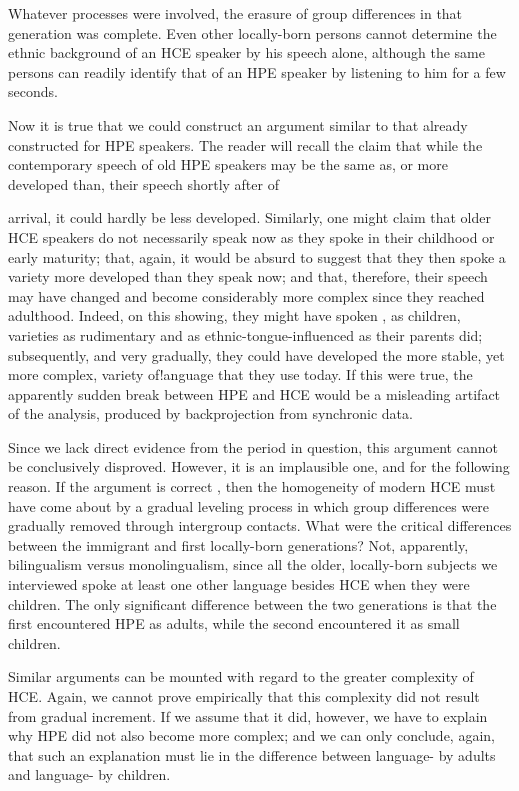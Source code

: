 Whatever processes were involved, the erasure of group differ\-ences in that generation was complete. Even other locally-born persons cannot determine the ethnic background of an HCE speaker by his speech alone, although the same persons can readily identify that of an HPE speaker by listening to him for a few seconds.

Now it is true that we could construct an argument similar to that already constructed for HPE speakers. The reader will recall the claim that while the contemporary speech of old HPE speakers may be the same as, or more developed than, their speech shortly after  of


arrival, it could hardly be less developed. Similarly, one might claim that older HCE speakers do not necessarily speak now as they spoke in their childhood or early maturity; that, again, it would be absurd to suggest that they then spoke a variety more developed than they speak now; and that, therefore, their speech may have changed and become considerably more complex since they reached adulthood. Indeed, on this showing, they might have spoken , as children, varieties as rudimentary and as ethnic-tongue-influenced as their parents did; subsequently, and very gradually, they could have developed the more stable, yet more complex, variety of!anguage that they use today. If this were true, the apparently sudden break between HPE and HCE would be a misleading artifact of the analysis, produced by back\-projection from synchronic data.

Since we lack direct evidence from the period in question, this argument cannot be conclusively disproved. However, it is an im\-plausible one, and for the following reason. If the argument is correct , then the homogeneity of modern HCE must have come about by a gradual leveling process in which group differences were gradually removed through intergroup contacts. What were the critical differ\-ences between the immigrant and first locally-born generations? Not, apparently, bilingualism versus monolingualism, since all the older, locally-born subjects we interviewed spoke at least one other language besides HCE when they were children. The only significant difference between the two generations is that the first encountered HPE as adults, while the second encountered it as small children.

Similar arguments can be mounted with regard to the greater complexity of HCE. Again, we cannot prove empirically that this complexity did not result from gradual increment. If we assume that it did, however, we have to explain why HPE did not also become more complex; and we can only conclude, again, that such an explanation must lie in the difference between language- by adults and language- by children.

